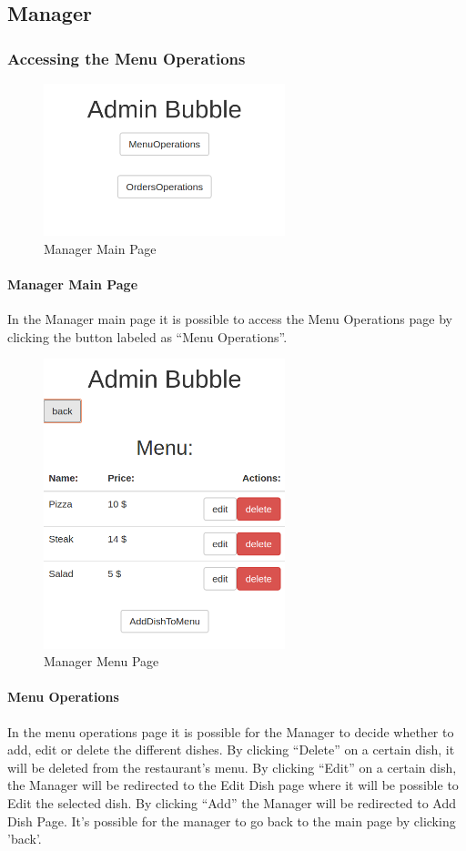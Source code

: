 \subsection{Manager}
\subsubsection{Accessing the Menu Operations}
\begin{figure}[H]
	\centering
	\includegraphics[width=7cm]{../../documenti/UserManualDemo/demo_screens/admin_main.png}
	\caption{Manager Main Page}
\end{figure}
\paragraph{Manager Main Page}
In the Manager main page it is possible to access the Menu Operations page by clicking the button labeled as ``Menu Operations''.

\begin{figure}[H]
	\centering
	\includegraphics[width=7cm]{../../documenti/UserManualDemo/demo_screens/admin_menu.png}
	\caption{Manager Menu Page}
\end{figure}
\paragraph{Menu Operations}
In the menu operations page it is possible for the Manager to decide whether to add, edit or delete the different dishes.
By clicking ``Delete'' on a certain dish, it will be deleted from the restaurant's menu.
By clicking ``Edit'' on a certain dish, the Manager will be redirected to the Edit Dish page where it will be possible to Edit the selected dish.
By clicking ``Add'' the Manager will be redirected to Add Dish Page.
It's possible for the manager to go back to the main page by clicking 'back'.

